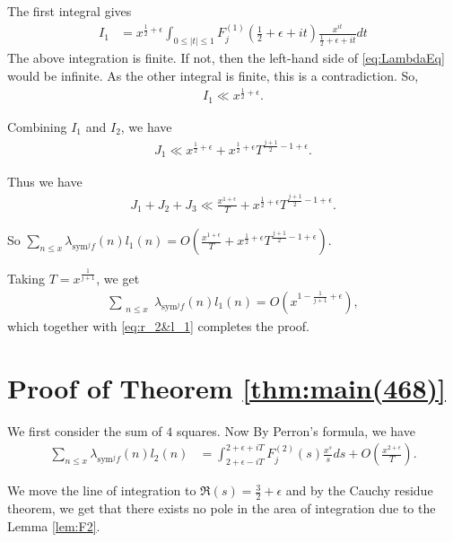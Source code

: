 \documentclass[10pt]{amsart}
\begin{document}
The first integral gives \begin{align*}
    I_1 &= x^{\frac{1}{2}+\epsilon}\int_{0 \leq |t| \leq 1}F_j^{(1)}\left(\frac{1}{2}+\epsilon+it\right) \frac{x^{it}}{\frac{1}{2}+\epsilon+it}dt
    \end{align*}
    The above integration is finite. If not, then the left-hand side of \eqref{eq:LambdaEq} would be infinite. As the other integral is finite, this is a contradiction. So,
    \begin{align*}
        I_1 \ll x^{\frac{1}{2}+\epsilon}.
    \end{align*}
    
    Combining $I_1$ and $I_2$, we have \begin{align}
    J_1 \ll x^{\frac{1}{2}+\epsilon} + x^{\frac{1}{2}+\epsilon} T^{\frac{j+1}{2}-1+\epsilon}.
    \end{align}
    
    Thus we have \begin{align}
    J_1+J_2+J_3 \ll \frac{x^{1+\epsilon}}{T}+x^{\frac{1}{2}+\epsilon} T^{\frac{j+1}{2}-1+\epsilon}.
    \end{align}

So $\sum_{n\leq x}\lambda_{\mathrm{sym}^{j}f}(n)l_1(n) = O \left(\frac{x^{1+\epsilon}}{T}+x^{\frac{1}{2}+\epsilon} T^{\frac{j+1}{2}-1+\epsilon} \right)$.

Taking $T = x^{\frac{1}{j+1}}$, we get
\begin{align}
        \sum_{\substack{n\leq x }}\lambda_{\mathrm{sym}^jf}(n)l_1(n) = O \left(x^{1-\frac{1}{j+1}+\epsilon} \right),
    \end{align}
which together with \eqref{eq:r_2&l_1} completes the proof.

\section{Proof of Theorem \ref{thm:main(468)}} \label{sec:main(468)}

We first consider the sum of $4$ squares. Now By Perron's formula, we have \begin{align}
    \sum_{n\leq x}\lambda_{\mathrm{sym}^{j}f}(n)l_2(n) & = \int_{2+\epsilon-iT}^{2+\epsilon+iT}F_{j}^{(2)}(s)\frac{x^s}{s}ds + O\left( \frac{x^{2+\epsilon}}{T}\right).
\end{align}

We move the line of integration to $\Re(s) = \frac{3}{2}+\epsilon$ and by the Cauchy residue theorem, we get that there exists no pole in the area of integration due to the Lemma \ref{lem:F2}.
\end{document}
